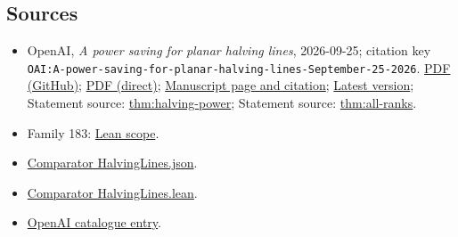 \documentclass[11pt]{article}
\begin{document}
\subsection{Sources}
\begin{itemize}
\item OpenAI, \emph{A power saving for planar halving lines}, 2026-09-25; citation key \texttt{OAI:A-power-saving-for-planar-halving-lines-September-25-2026}. \href{https://github.com/openai/math/blob/adc7f1241b42e322a6451854ab7e4b4c146bf78a/preprints/A-power-saving-for-planar-halving-lines-September-25-2026/main.pdf}{PDF (GitHub)}; \href{https://github.com/openai/math/raw/adc7f1241b42e322a6451854ab7e4b4c146bf78a/preprints/A-power-saving-for-planar-halving-lines-September-25-2026/main.pdf}{PDF (direct)}; \href{https://github.com/openai/math/blob/adc7f1241b42e322a6451854ab7e4b4c146bf78a/preprints/A-power-saving-for-planar-halving-lines-September-25-2026/README.md}{Manuscript page and citation}; \href{https://github.com/openai/math/blob/main/preprints/A-power-saving-for-planar-halving-lines-September-25-2026/main.pdf}{Latest version}; Statement source: \href{https://github.com/openai/math/blob/adc7f1241b42e322a6451854ab7e4b4c146bf78a/preprints/A-power-saving-for-planar-halving-lines-September-25-2026/build/sections/introduction.tex\#L9}{thm:halving-power}; Statement source: \href{https://github.com/openai/math/blob/adc7f1241b42e322a6451854ab7e4b4c146bf78a/preprints/A-power-saving-for-planar-halving-lines-September-25-2026/build/sections/introduction.tex\#L76}{thm:all-ranks}.
\item Family 183: \href{https://github.com/openai/math/blob/adc7f1241b42e322a6451854ab7e4b4c146bf78a/lean/docs/183.md}{Lean scope}.
\item \href{https://github.com/openai/math/blob/adc7f1241b42e322a6451854ab7e4b4c146bf78a/lean/ComparatorChallenges/HalvingLines.json}{Comparator HalvingLines.json}.
\item \href{https://github.com/openai/math/blob/adc7f1241b42e322a6451854ab7e4b4c146bf78a/lean/ComparatorChallenges/HalvingLines.lean}{Comparator HalvingLines.lean}.
\item \href{https://github.com/openai/math/blob/adc7f1241b42e322a6451854ab7e4b4c146bf78a/CONTENTS.md}{OpenAI catalogue entry}.
\end{itemize}
\end{document}
